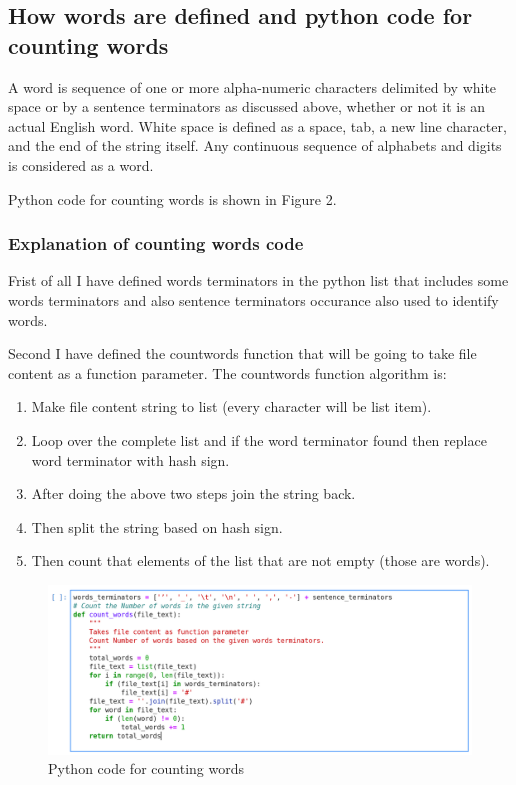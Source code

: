 \documentclass{article}
\begin{document}
\subsection{How words are defined and python code for counting words}

A word is sequence of one or more alpha-numeric characters delimited by white
space or by a sentence terminators as discussed above, whether or not it is an actual English word. White space is defined as a space, tab, a new line character, and the end of the string itself. Any continuous sequence of alphabets and digits is considered as a word.

Python code for counting words is shown in Figure 2. 
\subsubsection{Explanation of counting words code}
Frist of all I have defined words terminators in the python list that includes some words terminators and also sentence terminators occurance also used to identify words. 

Second I have defined the countwords function that will be going to take file content as a function parameter. The countwords function algorithm is:
\begin{enumerate}
  \item Make file content string to list (every character will be list item).
  \item Loop over the complete list and if the word terminator found then replace word terminator with hash sign.
  \item After doing the above two steps join the string back.
  \item Then split the string based on hash sign.
  \item Then count that elements of the list that are not empty (those are words).
\end{enumerate}

\begin{figure}
\centering
\includegraphics[scale=0.2]{screenshots/ai_a1-2.png}
\caption{\label{fig:python_code_counting_words}Python code for counting words}
\end{figure}
\end{document}
